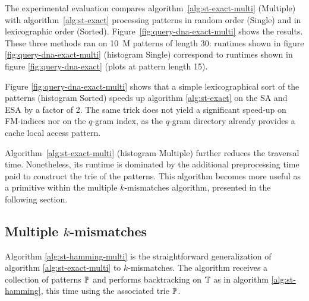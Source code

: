 The experimental evaluation compares algorithm~\ref{alg:st-exact-multi} (Multiple) with algorithm~\ref{alg:st-exact} processing patterns in random order (Single) and in lexicographic order (Sorted).
Figure~\ref{fig:query-dna-exact-multi} shows the results.
These three methods ran on 10~M patterns of length 30: runtimes shown in figure \ref{fig:query-dna-exact-multi} (histogram Single) correspond to runtimes shown in figure \ref{fig:query-dna-exact} (plots at pattern length 15).

Figure \ref{fig:query-dna-exact-multi} shows that a simple lexicographical sort of the patterns (histogram Sorted) speeds up algorithm \ref{alg:st-exact} on the SA and ESA by a factor of 2.
The same trick does not yield a significant speed-up on FM-indices nor on the $q$-gram index, as the $q$-gram directory already provides a cache local access pattern.

Algorithm~\ref{alg:st-exact-multi} (histogram Multiple) further reduces the traversal time.
Nonetheless, its runtime is dominated by the additional preprocessing time paid to construct the trie of the patterns.
This algorithm becomes more useful as a primitive within the multiple $k$-mismatches algorithm, presented in the following section.

\subsection{Multiple $k$-mismatches}
\label{sec:index:algo:multimismatch}

Algorithm \ref{alg:st-hamming-multi} is the straightforward generalization of algorithm \ref{alg:st-exact-multi} to $k$-mismatches.
The algorithm receives a collection of patterns $\mathbb{P}$ and performs backtracking on $\mathbb{T}$ as in algorithm  \ref{alg:st-hamming}, this time using the associated trie $\mathbb{P}$.

